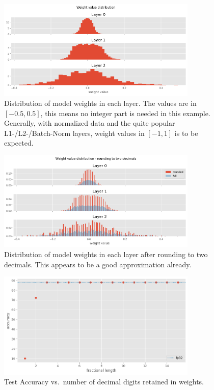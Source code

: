 \documentclass[11pt]{article}
\begin{document}
\begin{figure}[H]
	\centering
	\includegraphics[width=0.85\textwidth]{figures/118_dist.png}
	\caption{
		Distribution of model weights in each layer. The values are in $[-0.5, 0.5]$,
		this means no integer part is needed in this example. Generally, with normalized data
		and the quite popular L1-/L2-/Batch-Norm layers, weight values in $[-1, 1]$ is to be expected.}
\end{figure}

\begin{figure}[H]
	\centering
	\includegraphics[width=0.85\textwidth]{figures/118_dist2.png}
	\caption{Distribution of model weights in each layer after rounding to two decimals.
		This appears to be a good approximation already.}\label{fig:118_2}
\end{figure}

\begin{figure}[H]
	\centering
	\includegraphics[width=0.85\textwidth]{figures/118_accuracy.png}
	\caption{Test Accuracy vs.\ number of decimal digits retained in weights.}\label{fig:118_acc}
\end{figure}
\end{document}
